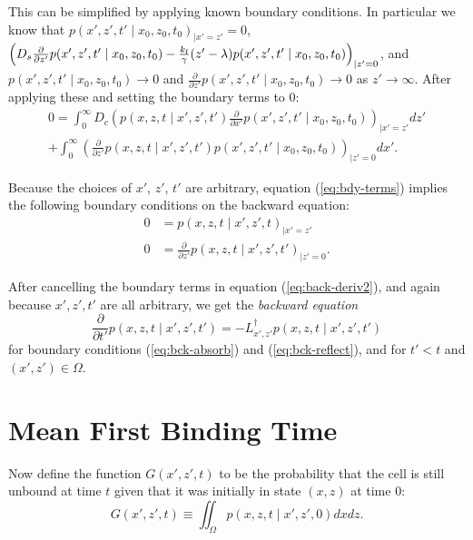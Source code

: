 \documentclass{article}
\newcommand{\tn}{\textnormal}
\newcommand{\stiff}{\frac{k_\tn{f}}{\gamma}}
\newcommand{\dd}{d}
\newcommand{\Pder}[2]{\frac{\partial #1}{\partial #2}}
\newcommand{\Integral}[4]{\int_{#3}^{#4} {#1} \dd #2}
\begin{document}
This can be simplified by applying known boundary conditions. In
particular we know that $p(x', z', t' \mid x_0, z_0, t_0)_{|x' = z'} = 0$,
$\left(D_s \Pder{}{z'} p(x', z', t' \mid x_0, z_0, t_0) - \stiff (z' -
\lambda) p(x', z', t' \mid x_0, z_0, t_0)\right)_{|z' = 0}$, and $p(x', z',
t' \mid x_0, z_0, t_0) \rightarrow 0$ and $\Pder{}{z'}p(x', z', t' \mid x_0,
z_0, t_0) \rightarrow 0$ as $z' \rightarrow \infty$. After applying
these and setting the boundary terms to 0:
\begin{multline}
  \label{eq:bdy-terms}
  0 = \Integral{D_c \left(p(x, z, t \mid x', z', t') \Pder{}{x'}p(x',
        z', t' \mid x_0, z_0, t_0)\right)_{|x' = z'}}{z'}{0}{\infty}
  \\
  + \Integral{\left(\Pder{}{z'}p(x, z, t \mid x', z', t') p(x', z',
        t' \mid x_0, z_0, t_0)\right)_{|z'=0}}{x'}{0}{\infty}.
\end{multline}

Because the choices of $x'$, $z'$, $t'$ are arbitrary, equation
(\ref{eq:bdy-terms}) implies the following boundary conditions on the
backward equation:
\begin{align}
  \label{eq:bck-absorb}
  0 &= p(x, z, t \mid x', z', t)_{|x' = z'} \\
  \label{eq:bck-reflect}
  0 &= \Pder{}{z'} p(x, z, t \mid x', z', t')_{|z' = 0}.
\end{align}

After cancelling the boundary terms in equation
(\ref{eq:back-deriv2}), and again because $x', z', t'$ are all
arbitrary, we get the \emph{backward equation}
\begin{equation}
  \Pder{}{t'} p(x, z, t \mid x', z', t') = -L^\dag_{x', z'} p(x, z, t \mid x',
  z', t')
  \label{eq:backward}
\end{equation}
for boundary conditions (\ref{eq:bck-absorb}) and
(\ref{eq:bck-reflect}), and for $t' < t$ and $(x', z') \in \Omega$.

\section{Mean First Binding Time}

Now define the function $G(x', z', t)$ to be the probability that the
cell is still unbound at time $t$ given that it was initially in state
$(x, z)$ at time $0$:
\begin{equation}
  G(x', z', t) \equiv \iint_\Omega p(x, z, t \mid x', z', 0) dx dz.
  \label{eq:G-defn}
\end{equation}
\end{document}
